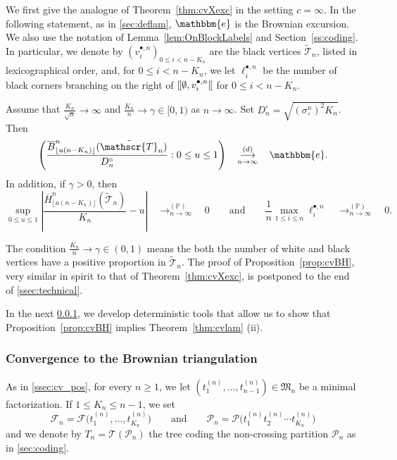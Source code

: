 \documentclass[10pt]{amsart}
\theoremstyle{definition}\newtheorem{defi}[theo]{Definition}\newtheorem{rema}[theo]{Remark}\newtheorem{exam}[theo]{Example}\newtheorem{exem}[theo]{Example}\newtheorem{nota}[theo]{Notation}
\renewcommand{\P}{\mathbb{P}}
\def\PPP{\mathcal P}
\def\FFF{\mathcal F}
\def\scn{\sigma_{\circ}^{n}}
\def\Dcn{D^{\circ}_{n}}
\def\oB{\overline{B}}
\def\oH{\overline{H}}
\def\tTs{\tilde{\Ts}}
\def\Ts{\mathscr{T}}
\def\llbracket{[\hspace{-.10em} [ }
\begin{document}
We first give the analogue of  Theorem~\ref{thm:cvXexc} in the setting $c=\infty$.
In the following statement, as in \cref{sec:deflam},
$\mathbbm{e}$ is the Brownian excursion.
We also use the notation of Lemma~\ref{lem:OnBlockLabels} and Section~\ref{ss:coding}.
 In particular,
 we denote by  $(v^{\bullet,n}_{i})_{0 \leq i < n-K_{n}}$ are the black vertices $\tTs_n$, listed in lexicographical order,
 and, for $0 \leq i < n-K_{n}$,
 we let $\ell^{\bullet,n}_{i}$ be  the number of black corners
 branching on the right of  $\llbracket \emptyset, v^{\bullet,n}_{i} \llbracket$ for $0 \leq i < n-K_{n}$.
\begin{proposition}
\label{prop:cvBH}
Assume that $\tfrac{K_{n}}{\sqrt{n}} \rightarrow \infty$ and $ \tfrac{K_{n}}{n}  \rightarrow \gamma \in [0,1)$ as $n \rightarrow \infty$. Set $\Dcn=\sqrt{ (\scn)^{2} K_{n} }$. Then
\[  \left(  \frac{\oB^{n}_{\lfloor u (n-K_{n}) \rfloor}(\tTs_{n})}{ \Dcn} : 0\leq u \leq 1\right)  \quad \mathop{\longrightarrow}^{(d)}_{n \rightarrow \infty} \quad\mathbbm{e}.\]
In addition, if $\gamma>0$, then
\[  \sup_{0 \leq u \leq 1} \left|   \frac{\oH^{n}_{ \lfloor u (n-K_{n}) \rfloor }(\tTs_{n})}{K_{n}}-u\right|  \quad \mathop{\longrightarrow}^{(\P)}_{n \rightarrow \infty} \quad 0 \qquad \textrm{and} \qquad \frac{1}{n} \max_{1 \leq i \leq n} \ell^{\bullet,n}_{i}  \quad \mathop{\longrightarrow}^{(\P)}_{n \rightarrow \infty} \quad 0.\]
\end{proposition}
The condition $ \tfrac{K_{n}}{n}  \rightarrow \gamma \in (0,1)$ means the both the number of white and black vertices have a positive proportion in $\tilde{\Ts}_{n}$. The proof of Proposition~\ref{prop:cvBH}, very similar in spirit to that of Theorem~\ref{thm:cvXexc}, is postponed  to the end of \cref{ssec:technical}.




In the next \cref{sec:cvBT}, we develop deterministic tools that allow us to show that Proposition~\ref{prop:cvBH} implies Theorem~\ref{thm:cvlam} (ii).



\subsubsection{Convergence to the Brownian triangulation}
\label{sec:cvBT}
As in \cref{ssec:cv_pos}, for every $n \geq 1$, we let $(t_{1}^{(n)}, \ldots, t_{n-1}^{(n)}) \in \mathfrak{M}_{n}$  be a minimal factorization. If $1 \leq K_{n} \leq n-1$, we set
\[  \FFF_{n}= \FFF \big( t_{1}^{(n)}, \ldots, t_{K_{n}}^{(n)}\big) \qquad \text{and} \qquad \PPP_{n}= \PPP\big(  t_{1}^{(n)}  t_{2}^{(n)}  \cdots t_{K_{n}}^{(n)}\big)\]
and we denote by $T_{n}= \mathcal{T}( \PPP_{n})$   the tree coding the non-crossing partition  $\PPP_{n}$ as in \cref{sec:coding}.
\end{document}
